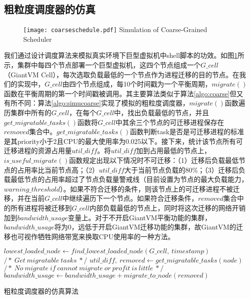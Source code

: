 \subsection{粗粒度调度器的仿真}
\begin{figure}[!htp]
  \centering
  \texttt{[image: coarseschedule.pdf]}
    {Simulation of Coarse-Grained Scheduler}
  \label{fig:simucoarse}
\end{figure}
我们通过设计调度算法来模拟真实环境下巨型虚拟机中shell脚本的功效。如图\ref{fig:simucoarse}所示，集群中每四个节点部署一个巨型虚拟机，这四个节点组成一个$G\_cell$（GiantVM Cell），每次选取负载最低的一个节点作为进程迁移的目的节点。在我们的实现中，$G\_cell$由四个节点组成，每10个时间戳为一个平衡周期，$migrate()$函数在平衡周期的第一个时间戳被调用。其主要算法类似于算法\ref{algo:coarse}但又有所不同：算法\ref{algo:simucoarse}实现了模拟的粗粒度调度器，$migrate()$函数遍历集群中所有的$G\_cell$，在每个$G\_cell$中，找出负载最低的节点，并且$get\_migratable\_tasks()$函数将$G\_cell$中其余三个节点的可迁移进程保存在$removed$集合中。$get\_migratable\_tasks()$函数判断task是否是可迁移进程的标准是其priority小于2且CPU的最大使用率为0.025以下。接下来，统计该节点所有可迁移进程的资源占用量$util\_diff$。将$util\_diff$加到占用最低的节点上，$is\_useful\_migrate()$函数规定出现以下情况时不可迁移：（1）迁移后负载最低节点的占用率比当前节点高；（2）$util\_diff$大于当前节点负载的80\%；（3）迁移后负载最低节点的占用率超过了节点负载量警戒线（目前设置为节点的最大负载能力，$warning\_threshold$）。如果不符合迁移的条件，则该节点上的可迁移进程不被迁移，并在当前$G\_cell$中继续遍历下一个节点。如果符合迁移条件，$removed$集合中的所有进程将被迁移到$G\_cell$内部负载最低的节点上，同时将这次迁移的网络开销加到$bandwidth\_usage$变量上。对于不开启GiantVM平衡功能的集群，$bandwidth\_usage$将为0，远低于开启GiantVM迁移功能的集群，故GiantVM的迁移也可视作牺牲网络带宽来换取CPU使用率的一种方法。

\begin{algorithm}[h]
\begin{algorithmic}[1]
\State $lowest\_loaded\_node \gets find\_lowest\_loaded\_node(G\_cell,\  timestamp)$
\State
{}
\State $/*\ Get\ migratable\ tasks\ */$
\State $util\_diff,\  removed \gets get\_migratable\_tasks(node)$
\State
\State $/*\ No\ migrate\ if\ cannot\ migrate\ or\ profit\ is\ little\ */$
\State $bandwidth\_usage \gets bandwidth\_usage + migrate\_to\_node(removed)$
\EndIf
\EndFor
\EndFor
\end{algorithmic}
\caption{粗粒度调度器的仿真算法}
\label{algo:simucoarse}
\end{algorithm}

